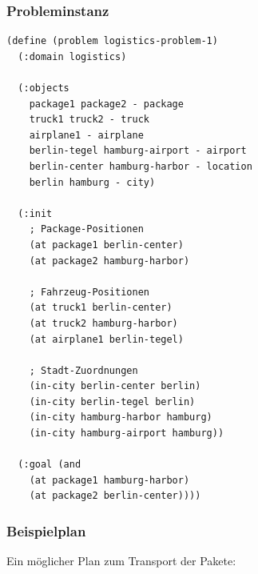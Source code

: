 ﻿\documentclass[a4paper,12pt]{article}
\theoremstyle{definition}
\begin{document}
\subsubsection{Probleminstanz}

\begin{lstlisting}[language=PDDL, caption=Logistics Problem]
(define (problem logistics-problem-1)
  (:domain logistics)
  
  (:objects
    package1 package2 - package
    truck1 truck2 - truck
    airplane1 - airplane
    berlin-tegel hamburg-airport - airport
    berlin-center hamburg-harbor - location
    berlin hamburg - city)
  
  (:init
    ; Package-Positionen
    (at package1 berlin-center)
    (at package2 hamburg-harbor)
    
    ; Fahrzeug-Positionen
    (at truck1 berlin-center)
    (at truck2 hamburg-harbor)
    (at airplane1 berlin-tegel)
    
    ; Stadt-Zuordnungen
    (in-city berlin-center berlin)
    (in-city berlin-tegel berlin)
    (in-city hamburg-harbor hamburg)
    (in-city hamburg-airport hamburg))
  
  (:goal (and
    (at package1 hamburg-harbor)
    (at package2 berlin-center))))
\end{lstlisting}

\subsubsection{Beispielplan}

Ein möglicher Plan zum Transport der Pakete:
\end{document}
